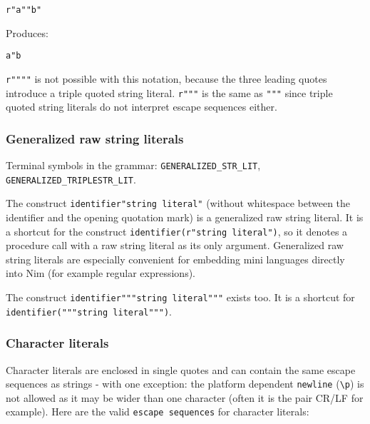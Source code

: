 \begin{verbatim}
r"a""b"
\end{verbatim}

Produces:

\begin{verbatim}
a"b
\end{verbatim}

\texttt{r""""} is not possible with this notation, because the three
leading quotes introduce a triple quoted string literal. \texttt{r"""}
is the same as \texttt{"""} since triple quoted string literals do not
interpret escape sequences either.

\hypertarget{generalized-raw-string-literals}{%
\subsubsection{Generalized raw string
literals}\label{generalized-raw-string-literals}}

Terminal symbols in the grammar: \texttt{GENERALIZED\_STR\_LIT},
\texttt{GENERALIZED\_TRIPLESTR\_LIT}.

The construct \texttt{identifier"string\ literal"} (without whitespace
between the identifier and the opening quotation mark) is a generalized
raw string literal. It is a shortcut for the construct
\texttt{identifier(r"string\ literal")}, so it denotes a procedure call
with a raw string literal as its only argument. Generalized raw string
literals are especially convenient for embedding mini languages directly
into Nim (for example regular expressions).

The construct \texttt{identifier"""string\ literal"""} exists too. It is
a shortcut for \texttt{identifier("""string\ literal""")}.

\hypertarget{character-literals}{%
\subsubsection{Character literals}\label{character-literals}}

Character literals are enclosed in single quotes
\texttt{\textquotesingle{}\textquotesingle{}} and can contain the same
escape sequences as strings - with one exception: the platform dependent
\texttt{newline} (\texttt{\textbackslash{}p}) is not allowed as it may
be wider than one character (often it is the pair CR/LF for example).
Here are the valid \texttt{escape\ sequences} for character literals:

